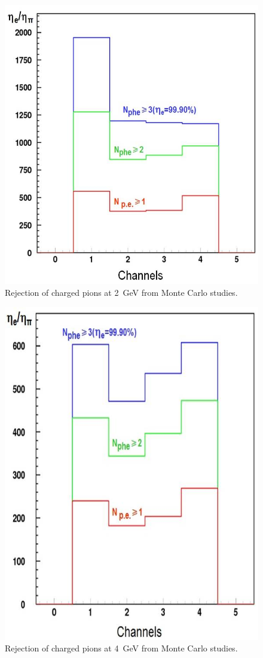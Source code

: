 \begin{figure}[!ht]
    \centering
    \includegraphics[width=1.0\linewidth,trim={0.0cm 0.0cm 0.0cm 0.0cm},clip]{images/Pion_rejection_2GeV.jpg}
    \caption{Rejection of charged pions at 2~GeV from Monte Carlo studies.}
    \label{fig:Pion_rejection_2GeV}
\end{figure}

\begin{figure}[!ht]
    \centering
    \includegraphics[width=1.0\linewidth,trim={0.0cm 0.0cm 0.0cm 0.0cm},clip]{images/Pion_rejection_4GeV.jpg}
    \caption{Rejection of charged pions at 4~GeV from Monte Carlo studies.}
    \label{fig:Pion_rejection_4GeV}
\end{figure}
